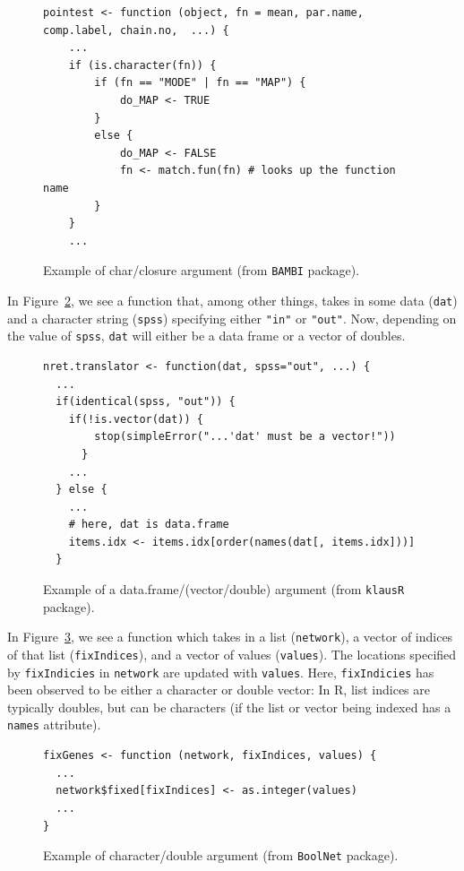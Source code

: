 \documentclass[acmsmall,10pt,review,anonymous]{acmart}\settopmatter{printfolios=true,printccs=false,printacmref=false}
\begin{document}
\begin{figure}[!hb]{\small\begin{lstlisting}[style=R]
pointest <- function (object, fn = mean, par.name, comp.label, chain.no,  ...) {
    ...
    if (is.character(fn)) {
        if (fn == "MODE" | fn == "MAP") {
            do_MAP <- TRUE
        }
        else {
            do_MAP <- FALSE
            fn <- match.fun(fn) # looks up the function name
        }
    }
    ...
\end{lstlisting}}\caption{Example of char/closure argument (from {\tt BAMBI} package).}\label{fig:charclos}\end{figure}

In Figure~\ref{fig:dfdbl}, we see a function that, among other things, takes in some data ({\tt dat}) and a character string ({\tt spss}) specifying either {\tt "in"} or {\tt "out"}.
Now, depending on the value of {\tt spss}, {\tt dat} will either be a data frame or a vector of doubles.

\begin{figure}[!hb]{\small\begin{lstlisting}[style=R]
nret.translator <- function(dat, spss="out", ...) {
  ...
  if(identical(spss, "out")) {
    if(!is.vector(dat)) {
        stop(simpleError("...'dat' must be a vector!"))
      }
    ...
  } else {
    ...
    # here, dat is data.frame
    items.idx <- items.idx[order(names(dat[, items.idx]))]
  }
\end{lstlisting}}\caption{Example of a data.frame/(vector/double) argument (from {\tt klausR} package).}\label{fig:dfdbl}\end{figure}

In Figure~\ref{fig:chardbl}, we see a function which takes in a list ({\tt network}), a vector of indices of that list ({\tt fixIndices}), and a vector of values ({\tt values}).
The locations specified by {\tt fixIndicies} in {\tt network} are updated with {\tt values}.
Here, {\tt fixIndicies} has been observed to be either a character or double vector:
In R, list indices are typically doubles, but can be characters (if the list or vector being indexed has a {\tt names} attribute).

\begin{figure}[!hb]{\small\begin{lstlisting}[style=R]
fixGenes <- function (network, fixIndices, values) {
  ...
  network$fixed[fixIndices] <- as.integer(values)
  ...
}
\end{lstlisting}}\caption{Example of character/double argument (from {\tt BoolNet} package).}\label{fig:chardbl}\end{figure}
\end{document}
